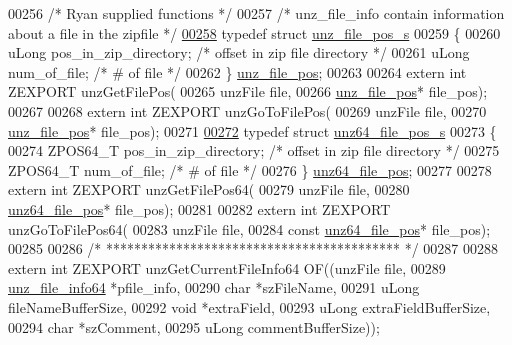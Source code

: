 \begin{DoxyCode}
00256 \textcolor{comment}{/* Ryan supplied functions */}
00257 \textcolor{comment}{/* unz\_file\_info contain information about a file in the zipfile */}
\hyperlink{structunz__file__pos__s}{00258} \textcolor{keyword}{typedef} \textcolor{keyword}{struct }\hyperlink{structunz__file__pos__s}{unz\_file\_pos\_s}
00259 \{
00260     uLong pos\_in\_zip\_directory;   \textcolor{comment}{/* offset in zip file directory */}
00261     uLong num\_of\_file;            \textcolor{comment}{/* # of file */}
00262 \} \hyperlink{structunz__file__pos__s}{unz\_file\_pos};
00263 
00264 \textcolor{keyword}{extern} \textcolor{keywordtype}{int} ZEXPORT unzGetFilePos(
00265     unzFile file,
00266     \hyperlink{structunz__file__pos__s}{unz\_file\_pos}* file\_pos);
00267 
00268 \textcolor{keyword}{extern} \textcolor{keywordtype}{int} ZEXPORT unzGoToFilePos(
00269     unzFile file,
00270     \hyperlink{structunz__file__pos__s}{unz\_file\_pos}* file\_pos);
00271 
\hyperlink{structunz64__file__pos__s}{00272} \textcolor{keyword}{typedef} \textcolor{keyword}{struct }\hyperlink{structunz64__file__pos__s}{unz64\_file\_pos\_s}
00273 \{
00274     ZPOS64\_T pos\_in\_zip\_directory;   \textcolor{comment}{/* offset in zip file directory */}
00275     ZPOS64\_T num\_of\_file;            \textcolor{comment}{/* # of file */}
00276 \} \hyperlink{structunz64__file__pos__s}{unz64\_file\_pos};
00277 
00278 \textcolor{keyword}{extern} \textcolor{keywordtype}{int} ZEXPORT unzGetFilePos64(
00279     unzFile file,
00280     \hyperlink{structunz64__file__pos__s}{unz64\_file\_pos}* file\_pos);
00281 
00282 \textcolor{keyword}{extern} \textcolor{keywordtype}{int} ZEXPORT unzGoToFilePos64(
00283     unzFile file,
00284     \textcolor{keyword}{const} \hyperlink{structunz64__file__pos__s}{unz64\_file\_pos}* file\_pos);
00285 
00286 \textcolor{comment}{/* ****************************************** */}
00287 
00288 \textcolor{keyword}{extern} \textcolor{keywordtype}{int} ZEXPORT unzGetCurrentFileInfo64 OF((unzFile file,
00289                          \hyperlink{structunz__file__info64__s}{unz\_file\_info64} *pfile\_info,
00290                          \textcolor{keywordtype}{char} *szFileName,
00291                          uLong fileNameBufferSize,
00292                          \textcolor{keywordtype}{void} *extraField,
00293                          uLong extraFieldBufferSize,
00294                          \textcolor{keywordtype}{char} *szComment,
00295                          uLong commentBufferSize));

\end{DoxyCode}
